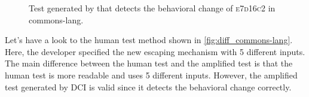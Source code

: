 \begin{figure}[h]
\centering
{}
\caption{Test generated by \DCII that detects the behavioral change of \textsc{e7d16c2} in commons-lang.}
\label{fig:ampl_commons-lang}
\end{figure}

Let's have a look to the human test method shown in \autoref{fig:diff_commons-lang}.
Here, the developer specified the new escaping mechanism with 5 different inputs.
%
The main difference between the human test and the amplified test is that the human test is more readable and uses 5 different inputs.
However, the amplified test generated by DCI is valid since it detects the behavioral change correctly.

